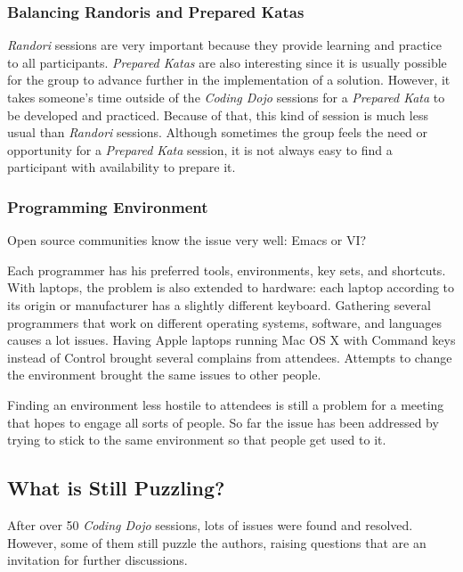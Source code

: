 \subsubsection{Balancing Randoris and Prepared Katas}

\emph{Randori} sessions are very important because they provide
learning and practice to all participants. \emph{Prepared Katas} are
also interesting since it is usually possible for the group to advance
further in the implementation of a solution. However, it takes
someone's time outside of the \emph{Coding Dojo} sessions for a
\emph{Prepared Kata} to be developed and practiced. Because of that,
this kind of session is much less usual than \emph{Randori} sessions.
Although sometimes the group feels the need or opportunity for a
\emph{Prepared Kata} session, it is not always easy to find a participant
with availability to prepare it.

\subsubsection{Programming Environment}

Open source communities know the issue very well: Emacs or VI?

Each programmer has his preferred tools, environments, key sets, and
shortcuts. With laptops, the problem is also extended to hardware:
each laptop according to its origin or manufacturer has a slightly
different keyboard. Gathering several programmers that work on
different operating systems, software, and languages causes a lot
issues. Having Apple laptops running Mac OS X with Command keys
instead of Control brought several complains from attendees. Attempts
to change the environment brought the same issues to other people.

Finding an environment less hostile to attendees is still a problem
for a meeting that hopes to engage all sorts of people. So far the
issue has been addressed by trying to stick to the same environment so
that people get used to it.

\subsection{What is Still Puzzling?}\label{ssub:puzzles}

After over 50 \emph{Coding Dojo} sessions, lots of issues were found
and resolved. However, some of them still puzzle the authors, raising
questions that are an invitation for further discussions.

